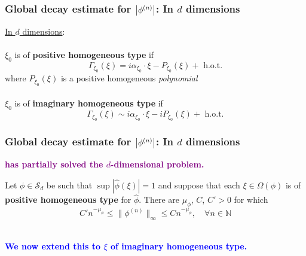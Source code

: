 \documentclass{beamer}
\theoremstyle{definition}
\begin{document}
\begin{frame}
\frametitle{Global decay estimate for $\abs{\phi^{(n)}}$: In $d$ dimensions}
\underline{In $d$ dimensions}:\\
$\,$\\

$\xi_0$ is of \textbf{positive homogeneous type} if
\begin{equation*}
\Gamma_{\xi_0}(\xi) = i\alpha_{\xi_0}\cdot\xi - P_{\xi_0}(\xi) + \text{ h.o.t.}
\end{equation*}
where $P_{\xi_0}(\xi)$ is a positive homogeneous \textit{polynomial}\\
$\,$\\


$\xi_0$ is of \textbf{imaginary homogeneous type} if
\begin{equation*}
\Gamma_{\xi_0}(\xi) \sim i\alpha_{\xi_0}\cdot \xi - iP_{\xi_0}(\xi)  + \text{ h.o.t.}
\end{equation*}
\end{frame}















\begin{frame}
\frametitle{Global decay estimate for $\abs{\phi^{(n)}}$: In $d$ dimensions}


\begin{center}
	\textbf{\textcolor{purple}{\cite{randles_convolution_2017} has partially solved the $d$-dimensional problem. }  }
\end{center}


\begin{theorem}\label{thm:d}
	Let $\phi \in \mathcal{S}_d$ be such that $\sup | \widehat{\phi}(\xi)| = 1$ and suppose that each $\xi \in \Omega(\phi)$ is of \textbf{positive homogeneous type} for $\widehat{\phi}$. There are $\mu_\phi$, $C$, $C' >0$ for which 
	\begin{equation*}
	C'n^{-\mu_\phi} \leq \| \phi^{(n)} \|_\infty \leq C n^{-\mu_\phi}, \quad \forall n\in \mathbb{N}
	\end{equation*}
\end{theorem}
$\,$\\

\centering\textcolor{blue}{\textbf{We now extend this to $\xi$ of imaginary homogeneous type.}}


\end{frame}
\end{document}
